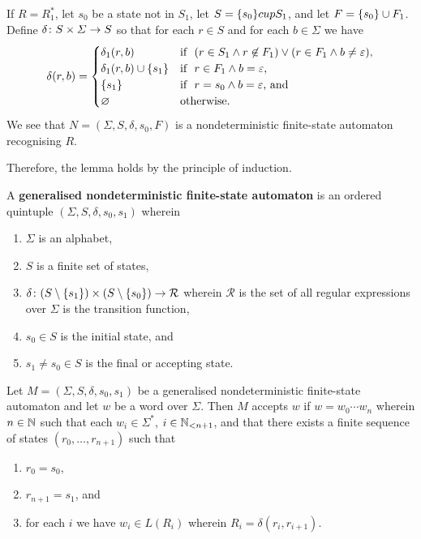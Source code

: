     If \(R = R_1^*\), let \(s_0\) be a state not in \(S_1\), let \(S = \set{s_0}
    cup S_1\), and let \(F = \set{s_0} \cup F_1\). Define \(\map{\delta}{S
    \times \varSigma}{S}\) so that for each \(r \in S\) and for each \(b \in
    \varSigma\) we have
    \[
        \delta(r, b) = \begin{cases}
            \delta_1(r, b) & \text{if }\ (r \in S_1 \land r \not\in F_1) \lor (r
            \in F_1 \land b \neq \varepsilon),\\
            \delta_1(r, b) \cup \set{s_1} & \text{if }\ r \in F_1 \land b =
            \varepsilon,\\
            \set{s_1} & \text{if }\ r = s_0 \land b = \varepsilon \text{, and}\\
            \nset & \text{otherwise.}
        \end{cases}
    \]
    We see that \(N = (\varSigma, S, \delta, s_0, F)\) is a nondeterministic
    finite-state automaton recognising \(R\).

    Therefore, the lemma holds by the principle of induction.
\Epr

\Bdf
    A {\bf generalised nondeterministic finite-state automaton} is an ordered
    quintuple \((\varSigma, S, \delta, s_0, s_1)\) wherein
    \begin{enumerate}
        \item \(\varSigma\) is an alphabet,
        \item \(S\) is a finite set of states,
        \item \(\map{\delta}{(S \setminus \set{s_1}) \times (S \setminus
        \set{s_0})}{\mathcal{R}}\) wherein \(\mathcal{R}\) is the set of all
        regular expressions over \(\varSigma\) is the transition function,
        \item \(s_0 \in S\) is the initial state, and
        \item \(s_1 \neq s_0 \in S\) is the final or accepting state.
    \end{enumerate}
\Edf

Let \(M = (\varSigma, S, \delta, s_0, s_1)\) be a generalised nondeterministic
finite-state automaton and let \(w\) be a word over \(\varSigma\). Then \(M\)
accepts \(w\) if \(w = w_0 \cdots w_n\) wherein \(n \in \setnat\) such that each
\(w_i \in \varSigma^*\), \(i \in \Nln[n + 1]\), and that there exists a finite
sequence of states \((r_0, \ldots, r_{n + 1})\) such that
\begin{enumerate}
    \item \(r_0 = s_0\),
    \item \(r_{n + 1} = s_1\), and
    \item for each \(i\) we have \(w_i \in L(R_i)\) wherein \(R_i = \delta(r_i,
    r_{i + 1})\).
\end{enumerate}


